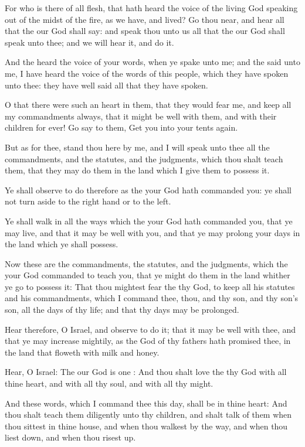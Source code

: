 \Verse For who is there of all flesh, that hath heard the voice of the living God speaking out of the midst of the fire, as we have, and lived?  \Verse Go thou near, and hear all that the \LORD our God shall say: and speak thou unto us all that the \LORD our God shall speak unto thee; and we will hear it, and do it.

\Verse And the \LORD heard the voice of your words, when ye spake unto me; and the \LORD said unto me, I have heard the voice of the words of this people, which they have spoken unto thee: they have well said all that they have spoken.

\Verse O that there were such an heart in them, that they would fear me, and keep all my commandments always, that it might be well with them, and with their children for ever!  \Verse Go say to them, Get you into your tents again.

\Verse But as for thee, stand thou here by me, and I will speak unto thee all the commandments, and the statutes, and the judgments, which thou shalt teach them, that they may do them in the land which I give them to possess it.

\Verse Ye shall observe to do therefore as the \LORD your God hath commanded you: ye shall not turn aside to the right hand or to the left.

\Verse Ye shall walk in all the ways which the \LORD your God hath commanded you, that ye may live, and that it may be well with you, and that ye may prolong your days in the land which ye shall possess.


\Chapter
\Verse Now these are the commandments, the statutes, and the judgments, which the \LORD your God commanded to teach you, that ye might do them in the land whither ye go to possess it: \Verse That thou mightest fear the \LORD thy God, to keep all his statutes and his commandments, which I command thee, thou, and thy son, and thy son's son, all the days of thy life; and that thy days may be prolonged.

\Verse Hear therefore, O Israel, and observe to do it; that it may be well with thee, and that ye may increase mightily, as the \LORD God of thy fathers hath promised thee, in the land that floweth with milk and honey.

\Verse Hear, O Israel: The \LORD our God is one \LORD: \Verse And thou shalt love the \LORD thy God with all thine heart, and with all thy soul, and with all thy might.

\Verse And these words, which I command thee this day, shall be in thine heart: \Verse And thou shalt teach them diligently unto thy children, and shalt talk of them when thou sittest in thine house, and when thou walkest by the way, and when thou liest down, and when thou risest up.

